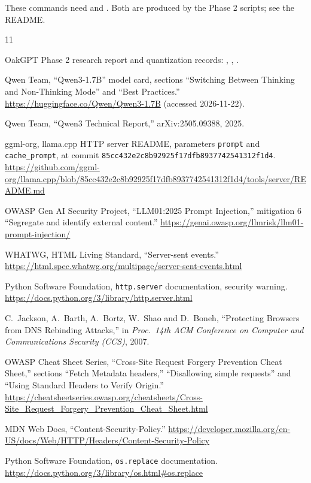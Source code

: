 \documentclass[11pt,a4paper]{article}
\newcommand{\code}[1]{\texttt{#1}}
\begin{document}
These commands need  and
. Both are produced by the Phase 2 scripts; see
the README.

\begin{thebibliography}{11}
\small

 OakGPT Phase 2 research report and quantization records:
  , ,
  .

 Qwen Team, ``Qwen3-1.7B'' model card, sections ``Switching Between
  Thinking and Non-Thinking Mode'' and ``Best Practices.''
  \url{https://huggingface.co/Qwen/Qwen3-1.7B} (accessed 2026-11-22).

 Qwen Team, ``Qwen3 Technical Report,'' arXiv:2505.09388, 2025.

 ggml-org, llama.cpp HTTP server README, parameters \code{prompt} and
  \code{cache\_prompt}, at commit \code{85cc432e2c8b92925f17dfb8937742541312f1d4}.
  \url{https://github.com/ggml-org/llama.cpp/blob/85cc432e2c8b92925f17dfb8937742541312f1d4/tools/server/README.md}

 OWASP Gen AI Security Project, ``LLM01:2025 Prompt Injection,''
  mitigation 6 ``Segregate and identify external content.''
  \url{https://genai.owasp.org/llmrisk/llm01-prompt-injection/}

 WHATWG, HTML Living Standard, ``Server-sent events.''
  \url{https://html.spec.whatwg.org/multipage/server-sent-events.html}

 Python Software Foundation, \code{http.server} documentation, security
  warning. \url{https://docs.python.org/3/library/http.server.html}

 C.~Jackson, A.~Barth, A.~Bortz, W.~Shao and D.~Boneh, ``Protecting
  Browsers from DNS Rebinding Attacks,'' in \emph{Proc.\ 14th ACM Conference on Computer
  and Communications Security (CCS)}, 2007.

 OWASP Cheat Sheet Series, ``Cross-Site Request Forgery Prevention
  Cheat Sheet,'' sections ``Fetch Metadata headers,'' ``Disallowing simple requests'' and
  ``Using Standard Headers to Verify Origin.''
  \url{https://cheatsheetseries.owasp.org/cheatsheets/Cross-Site_Request_Forgery_Prevention_Cheat_Sheet.html}

 MDN Web Docs, ``Content-Security-Policy.''
  \url{https://developer.mozilla.org/en-US/docs/Web/HTTP/Headers/Content-Security-Policy}

 Python Software Foundation, \code{os.replace} documentation.
  \url{https://docs.python.org/3/library/os.html#os.replace}

\end{thebibliography}
\end{document}
